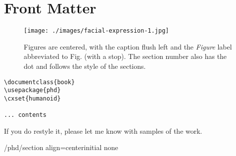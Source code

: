 \section{Front Matter}
\begin{figure}[ht]
\centering
\texttt{[image: ./images/facial-expression-1.jpg]}
\caption{Figures are centered, with the caption flush left and the \textit{Figure} label abbreviated to Fig. (with a stop). The section number also has the dot and follows the style of the sections.}
\label{fig:eight02}
\end{figure}


\begin{verbatim}
\documentclass{book}
\usepackage{phd}
\cxset{humanoid}

... contents

\end{verbatim}

If you do restyle it, please let me know with samples of the work.

\begin{key}{/phd/section align=center}{initial none}

\end{key}






